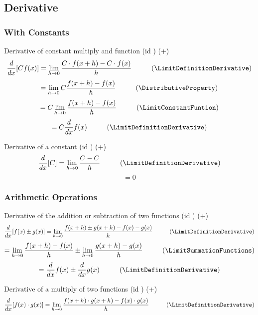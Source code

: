 \documentclass{book}
\begin{document}
            \subsection{Derivative}
                \subsubsection{With Constants}
                    Derivative of constant multiply and function (id \DerivativeConstantMultiply) (+)
                    \[\frac{d}{dx} [C f(x)] = \lim_{h \rightarrow 0} \frac{C \cdot f(x + h) - C \cdot f(x)}{h} \hspace{1cm} (\LimitDefinitionDerivative)\]
                    \[= \lim_{h \rightarrow 0} C \frac{f(x + h) - f(x)}{h} \hspace{1cm} (\DistributiveProperty)\]
                    \[= C \lim_{h \rightarrow 0} \frac{f(x + h) - f(x)}{h} \hspace{1cm} (\LimitConstantFuntion)\]
                    \[= C \frac{d}{dx} f(x) \hspace{1cm} (\LimitDefinitionDerivative)\]

                    Derivative of a constant (id \DerivativeConstant) (+)
                    \[\frac{d}{dx} [C] = \lim_{h \rightarrow 0} \frac{C - C}{h} \hspace{1cm} (\LimitDefinitionDerivative)\]
                    \[= 0\]

                \subsubsection{Arithmetic Operations}
                    Derivative of the addition or subtraction of two functions (id \DerivativeAdditionFunction) (+)
                    \[\frac{d}{dx} [f(x) \pm g(x)] = \lim_{h \rightarrow 0} \frac{f(x + h) \pm g(x + h) - f(x) -g(x)}{h} \hspace{1cm} (\LimitDefinitionDerivative)\]
                    \[= \lim_{h \rightarrow 0} \frac{f(x + h) - f(x)}{h} \pm \lim_{h \rightarrow 0} \frac{g(x + h) - g(x)}{h} \hspace{1cm} (\LimitSummationFunctions)\]
                    \[= \frac{d}{dx} f(x) \pm \frac{d}{dx} g(x) \hspace{1cm} (\LimitDefinitionDerivative)\]
    
                    Derivative of a multiply of two functions (id \DerivativeMultiplyFunctions) (+)
                    \[\frac{d}{dx} [f(x) \cdot g(x)] = \lim_{h \rightarrow 0} \frac{f(x + h) \cdot g(x + h) - f(x) \cdot g(x)}{h} \hspace{1cm} (\LimitDefinitionDerivative)\]
\end{document}
